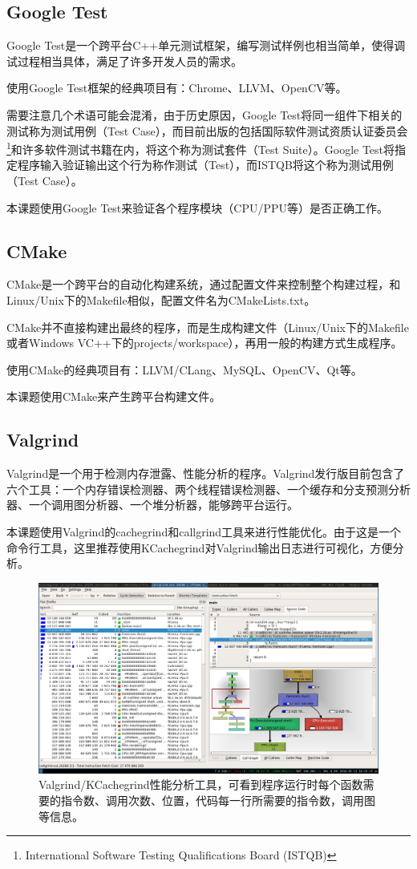 \documentclass[a4paper]{ltxdoc}
\begin{document}
{\subsection{Google Test}
Google Test是一个跨平台C++单元测试框架，编写测试样例也相当简单，使得调试过程相当具体，满足了许多开发人员的需求。

使用Google Test框架的经典项目有：Chrome、LLVM、OpenCV等。

需要注意几个术语可能会混淆，由于历史原因，Google Test将同一组件下相关的测试称为测试用例（Test Case），而目前出版的包括国际软件测试资质认证委员会\footnote{International Software Testing Qualifications Board (ISTQB)}和许多软件测试书籍在内，将这个称为测试套件（Test Suite）。Google Test将指定程序输入验证输出这个行为称作测试（Test），而ISTQB将这个称为测试用例（Test Case）。

本课题使用Google Test来验证各个程序模块（CPU/PPU等）是否正确工作。

\subsection{CMake}
CMake是一个跨平台的自动化构建系统，通过配置文件来控制整个构建过程，和Linux/Unix下的Makefile相似，配置文件名为CMakeLists.txt。

CMake并不直接构建出最终的程序，而是生成构建文件（Linux/Unix下的Makefile或者Windows VC++下的projects/workspace），再用一般的构建方式生成程序。

使用CMake的经典项目有：LLVM/CLang、MySQL、OpenCV、Qt等。

本课题使用CMake来产生跨平台构建文件。
\subsection{Valgrind}
Valgrind是一个用于检测内存泄露、性能分析的程序。Valgrind发行版目前包含了六个工具：一个内存错误检测器、两个线程错误检测器、一个缓存和分支预测分析器、一个调用图分析器、一个堆分析器，能够跨平台运行。

本课题使用Valgrind的cachegrind和callgrind工具来进行性能优化。由于这是一个命令行工具，这里推荐使用KCachegrind对Valgrind输出日志进行可视化，方便分析。

\begin{figure}[h]
	\centering
	\includegraphics[width=\textwidth]{images/kcachegrind.png}
	\caption[Valgrind/KCachegrind性能分析工具]{Valgrind/KCachegrind性能分析工具，可看到程序运行时每个函数需要的指令数、调用次数、位置，代码每一行所需要的指令数，调用图等信息。}
	\label{fig:kcachegrind}
\end{figure}

}
\end{document}
